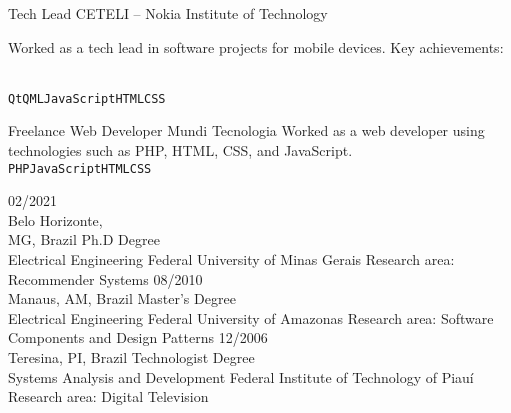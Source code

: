 \documentclass[10pt]{developercv} %
\begin{document}
\begin{entrylist}
  {Tech Lead}
  {CETELI -- Nokia Institute of Technology}
  {
    Worked as a tech lead in software projects for mobile devices. Key achievements:\\
    \begin{contributionlist}
    \end{contributionlist}\\
    \texttt{Qt}\slashsep\texttt{QML}\slashsep\texttt{JavaScript}\slashsep\texttt{HTML}\slashsep\texttt{CSS}}
  {Freelance Web Developer}
  {Mundi Tecnologia}
  {Worked as a web developer using technologies such as PHP, HTML, CSS, and JavaScript.\\
    \texttt{PHP}\slashsep\texttt{JavaScript}\slashsep\texttt{HTML}\slashsep\texttt{CSS}}
\end{entrylist}



\begin{entrylist}
  \entry
  {02/2021\\\footnotesize{Belo Horizonte, \\MG, Brazil}}
  {Ph.D Degree\\Electrical Engineering}
  {Federal University of Minas Gerais}
  {Research area: Recommender Systems}
  \entry
  {08/2010\\\footnotesize{Manaus, AM, Brazil}}
  {Master's Degree\\Electrical Engineering}
  {Federal University of Amazonas}
  {Research area: Software Components and Design Patterns}
  \entry
  {12/2006\\\footnotesize{Teresina, PI, Brazil}}
  {Technologist Degree\\Systems Analysis and Development}
  {Federal Institute of Technology of Piauí}
  {Research area: Digital Television}
\end{entrylist}


\begin{minipage}[t]{0.3\textwidth}
  \vspace{-\baselineskip} %


  \begin{skills}
  \end{skills}
\end{minipage}
\end{document}
